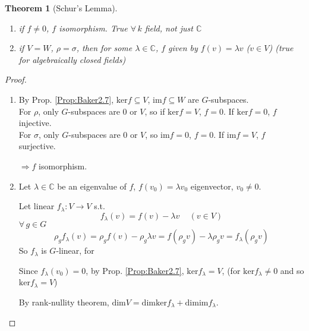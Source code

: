\documentclass[10pt]{amsart}
\newtheorem{theorem}{Theorem}
\begin{document}
\begin{multicols*}{2}
\begin{theorem}[Schur's Lemma]
	\begin{enumerate}
		\item[(a)] if $f\neq 0$, $f$ isomorphism.  True $\forall \, k$ field, not just $\mathbb{C}$
		\item[(b)] if $V=W$, $\rho = \sigma$, then for some $\lambda \in \mathbb{C}$, $f$ given by $f(v) = \lambda v$ ($v\in V$) (true for algebraically closed fields)
	\end{enumerate}
\end{theorem}

\begin{proof}
	\begin{enumerate}
		\item[(a)] By Prop. \ref{Prop:Baker2.7}, $\text{ker}f \subseteq V$, $\text{im}f \subseteq W$ are $G$-subspaces.  \\
		For $\rho$, only $G$-subspaces are $0$ or $V$, so if $\text{ker}f = V$, $f=0$.  If $\text{ker}f = 0$, $f$ injective.  \\
		For $\sigma$, only $G$-subspaces are $0$ or $V$, so $\text{im}f =0 $, $f=0$.  If $\text{im}f =V$, $f$ surjective.  
		
		$\Longrightarrow f$ isomorphism.  
		\item[(b)] Let $\lambda \in \mathbb{C}$ be an eigenvalue of $f$, $f(v_0) = \lambda v_0$ eigenvector, $v_0 \neq 0$.  
		
		Let linear $f_{\lambda} : V \to V$ s.t. 
		\[
		f_{\lambda}(v) = f(v) - \lambda v \quad \, (v\in V)
		\]
		$\forall \, g \in G$
		\[
		\rho_g f_{\lambda}(v) = \rho_gf(v) - \rho_g \lambda v = f(\rho_g v) - \lambda \rho_g v= f_{\lambda}(\rho_g v)
		\]
		So $f_{\lambda}$ is $G$-linear, for 
		
		
		Since $f_{\lambda}(v_0) =0$, by Prop. \ref{Prop:Baker2.7}, $\text{ker}f_{\lambda} = V$, (for $\text{ker}f_{\lambda}\neq 0$ and so $\text{ker}f_{\lambda}=V$)
		
		By rank-nullity theorem, $\text{dim}V = \text{dim}\text{ker}f_{\lambda} + \text{dim}\text{im}f_{\lambda}$.  
		

\end{enumerate}
\end{proof}
\end{multicols*}
\end{document}

